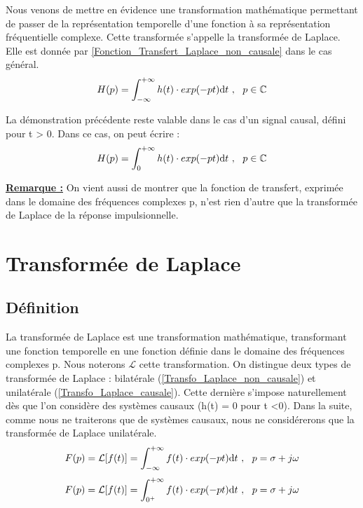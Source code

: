 	Nous venons de mettre en évidence une transformation mathématique permettant de passer de la représentation temporelle d'une fonction à sa représentation fréquentielle complexe. Cette transformée s'appelle la transformée de Laplace. Elle est donnée par \ref{Fonction_Transfert_Laplace_non_causale} dans le cas général.
	\begin{equation}\label{Fonction_Transfert_Laplace_non_causale}
	H(p) = \int_{-\infty}^{+\infty} h(t) \cdot exp(-pt)	\mathrm{d} t~,~~p \in \mathbb{C}	
	\end{equation}	
	
	La démonstration précédente reste valable dans le cas d'un signal causal, défini pour t > 0. Dans ce cas, on peut écrire :
	\begin{equation}\label{Fonction_Transfert_Laplace_causale}
	H(p) = \int_{0}^{+\infty} h(t) \cdot exp(-pt)	\mathrm{d} t~,~~p \in \mathbb{C}	
	\end{equation}
	
	\textbf{\underline{Remarque :}}
	On vient aussi de montrer que la fonction de transfert, exprimée dans le domaine des fréquences complexes p, n'est rien d'autre que la transformée de Laplace de la réponse impulsionnelle.\\
	
	\section{Transformée de Laplace}
	\subsection{Définition}
	La transformée de Laplace est une transformation mathématique, transformant une fonction temporelle en une fonction définie dans le domaine des fréquences complexes p. Nous noterons $\mathcal{L}$ cette transformation. On distingue deux types de transformée de Laplace : bilatérale (\ref{Transfo_Laplace_non_causale}) et unilatérale (\ref{Transfo_Laplace_causale}). Cette dernière s'impose naturellement dès que l'on considère des systèmes causaux (h(t) = 0 pour t <0). Dans la suite, comme nous ne traiterons que de systèmes causaux, nous ne considérerons que la transformée de Laplace unilatérale.
	\begin{equation}\label{Transfo_Laplace_non_causale}
	F(p) = \mathcal{L}[f(t)] = \int_{-\infty}^{+\infty} f(t) \cdot exp(-pt)	\mathrm{d} t~,~~p=\sigma + j \omega	
	\end{equation}
	\begin{equation}\label{Transfo_Laplace_causale}
	F(p) = \mathcal{L}[f(t)] = \int_{0^{+}}^{+\infty} f(t) \cdot exp(-pt)	\mathrm{d} t~,~~p=\sigma + j \omega	
	\end{equation}
	
